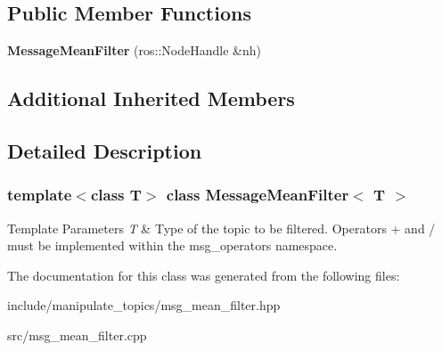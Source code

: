\subsection*{Public Member Functions}
\begin{DoxyCompactItemize}
\item 
\mbox{\label{classMessageMeanFilter_a613460b271336914553f2beb05f4da9b}} 
{\bfseries Message\+Mean\+Filter} (ros\+::\+Node\+Handle \&nh)
\end{DoxyCompactItemize}
\subsection*{Additional Inherited Members}


\subsection{Detailed Description}
\subsubsection*{template$<$class T$>$\newline
class Message\+Mean\+Filter$<$ T $>$}


\begin{DoxyTemplParams}{Template Parameters}
{\em T} & Type of the topic to be filtered. Operators + and / must be implemented within the msg\+\_\+operators namespace. \\
\hline
\end{DoxyTemplParams}


The documentation for this class was generated from the following files\+:\begin{DoxyCompactItemize}
\item 
include/manipulate\+\_\+topics/msg\+\_\+mean\+\_\+filter.\+hpp\item 
src/msg\+\_\+mean\+\_\+filter.\+cpp\end{DoxyCompactItemize}
